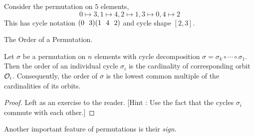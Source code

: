 \documentclass[../../book.tex]{subfiles}
\begin{document}
\begin{eg}
    
    Consider the permutation on $5$ elements, \[
        0 \mapsto 3, 1 \mapsto 4, 2 \mapsto 1, 3 \mapsto 0, 4 \mapsto 2
    \]
    This has cycle notation $(0\mspace{12mu}3) (1\mspace{12mu}4\mspace{12mu}2)$
    and cycle shape $[2, 3]$. 
    
\end{eg}

\begin{thm} The Order of a Permutation. 
    
    Let $\sigma$ be a permutation on $n$ elements 
    with cycle decomposition $\sigma = \sigma_k \circ \cdots \circ \sigma_1$. 
    Then the order of an individual cycle $\sigma_i$ is 
    the cardinality of corresponding orbit $\mathcal{O}_i$.
    Consequently, the order of $\sigma$ is the lowest common multiple
    of the cardinalities of its orbits. 

\end{thm}
\begin{proof}
    
    Left as an exercise to the reader. 
    [Hint : Use the fact that the cycles $\sigma_i$ commute with each other.]
    
\end{proof}

Another important feature of permutations is their \emph{sign}. 
\end{document}
